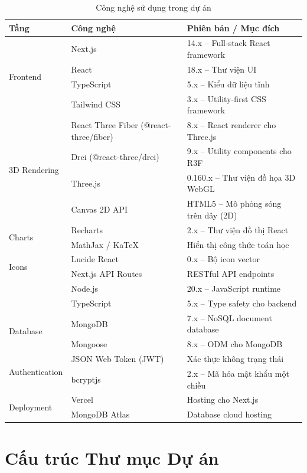 \begin{table}[H]
\centering
\caption{Công nghệ sử dụng trong dự án}
\begin{tabular}{|p{}|p{}|p{}|}
\hline
\textbf{Tầng} & \textbf{Công nghệ} & \textbf{Phiên bản / Mục đích} \\
\hline
\multirow{4}{*}{Frontend} 
& Next.js & 14.x – Full-stack React framework \\
& React & 18.x – Thư viện UI \\
& TypeScript & 5.x – Kiểu dữ liệu tĩnh \\
& Tailwind CSS & 3.x – Utility-first CSS framework \\
\hline
\multirow{4}{*}{3D Rendering} 
& React Three Fiber (@react-three/fiber) & 8.x – React renderer cho Three.js \\
& Drei (@react-three/drei) & 9.x – Utility components cho R3F \\
& Three.js & 0.160.x – Thư viện đồ họa 3D WebGL \\
& Canvas 2D API & HTML5 – Mô phỏng sóng trên dây (2D) \\
\hline
\multirow{2}{*}{Charts} 
& Recharts & 2.x – Thư viện đồ thị React \\
& MathJax / KaTeX & Hiển thị công thức toán học \\
\hline
\multirow{2}{*}{Icons} 
& Lucide React & 0.x – Bộ icon vector \\
\hline
\multirow{3}{*}{Backend} 
& Next.js API Routes & RESTful API endpoints \\
& Node.js & 20.x – JavaScript runtime \\
& TypeScript & 5.x – Type safety cho backend \\
\hline
\multirow{2}{*}{Database} 
& MongoDB & 7.x – NoSQL document database \\
& Mongoose & 8.x – ODM cho MongoDB \\
\hline
\multirow{2}{*}{Authentication} 
& JSON Web Token (JWT) & Xác thực không trạng thái \\
& bcryptjs & 2.x – Mã hóa mật khẩu một chiều \\
\hline
\multirow{2}{*}{Deployment} 
& Vercel & Hosting cho Next.js \\
& MongoDB Atlas & Database cloud hosting \\
\hline
\end{tabular}
\end{table}

\section{Cấu trúc Thư mục Dự án}

